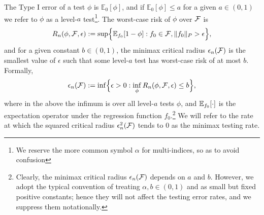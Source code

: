 The Type I error of a test $\phi$ is $\mathbb{E}_0[\phi]$, and if $\mathbb{E}_0[\phi] \leq a$ for a given $a \in (0,1)$ we refer to $\phi$ as a level-$a$ test\footnote{We reserve the more common symbol $\alpha$ for multi-indices, so as to avoid confusion}. The worst-case risk of $\phi$ over $\mathcal{F}$ is
\begin{equation*}
R_n(\phi, \mathcal{F}, \epsilon) := \sup\Bigl\{\mathbb{E}_{f_0}[1 - \phi]: f_0 \in \mathcal{F}, \|f_0\|_{P} > \epsilon\Bigr\},
\end{equation*}
and for a given constant $b \in (0,1)$, the minimax critical radius $\epsilon_n(\mathcal{F})$ is the smallest value of $\epsilon$ such that some level-$a$ test has worst-case risk of at most $b$. Formally,
\begin{equation*}
\epsilon_n(\mathcal{F}) := \inf\Bigl\{\epsilon > 0: \inf_{\phi} R_n(\phi,\mathcal{F},\epsilon) \leq b \Bigr\},
\end{equation*} 
where in the above the infimum is over all level-$a$ tests $\phi$, and $\mathbb{E}_{f_0}[\cdot]$ is the expectation operator under the regression function $f_0$.\footnote{Clearly, the minimax critical radius $\epsilon_n(\mathcal{F})$ depends on $a$ and $b$. However, we adopt the typical convention of treating $\alpha,b \in (0,1)$ and  as small but fixed positive constants; hence they will not affect the testing error rates, and we suppress them notationally.} We will refer to the rate at which the squared critical radius $\epsilon_n^2(\mathcal{F})$ tends to $0$ as the minimax testing rate.

